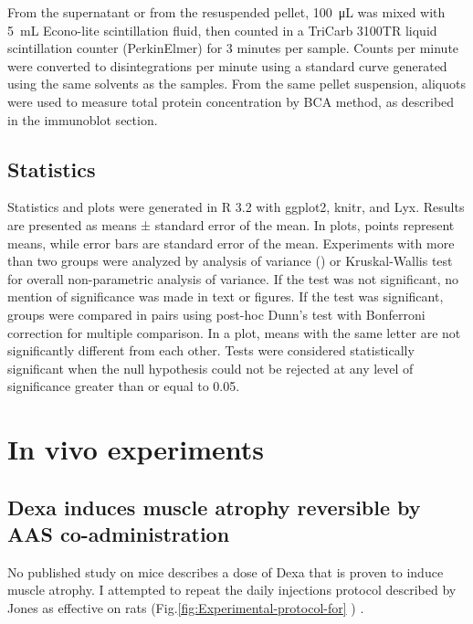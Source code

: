 \documentclass[12pt,english]{report}\usepackage[]{graphicx}\usepackage[]{color}
\begin{document}
From the supernatant or from the resuspended pellet, \SI{100}{\micro\liter}
was mixed with \SI{5}{\milli\liter} Econo-lite scintillation fluid,
then counted in a TriCarb 3100TR liquid scintillation counter (PerkinElmer)
for 3 minutes per sample. Counts per minute were converted to disintegrations
per minute using a standard curve generated using the same solvents
as the samples. From the same pellet suspension, aliquots were used
to measure total protein concentration by BCA method, as described
in the immunoblot section.


\section{Statistics}

Statistics and plots were generated in R 3.2 with ggplot2, knitr,
and Lyx\citep{stodden2014implementing}. Results are presented as
means ± standard error of the mean. In plots, points represent means,
while error bars are standard error of the mean. Experiments with
more than two groups were analyzed by analysis of variance ()
or Kruskal-Wallis test for overall non-parametric analysis of variance.
If the test was not significant, no mention of significance was made
in text or figures. If the test was significant, groups were compared
in pairs using post-hoc Dunn's test with Bonferroni correction for
multiple comparison. In a plot, means with the same letter are not
significantly different from each other. Tests were considered statistically
significant when the null hypothesis could not be rejected at any
level of significance greater than or equal to 0.05.

\begin{singlespace}
\pagebreak{}
\end{singlespace}


\chapter{In vivo experiments}


\section{Dexa induces muscle atrophy reversible by AAS co-administration}

No published study on mice describes a dose of Dexa that is proven
to induce muscle atrophy. I attempted to repeat the daily injections
protocol described by Jones as effective on rats\citep{jones2010effects}
(Fig.\ref{fig:Experimental-protocol-for} ) .
\end{document}

